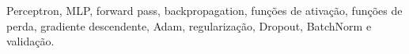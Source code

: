 
Perceptron, MLP, forward pass, backpropagation, funções de ativação, funções de perda, gradiente descendente, Adam, regularização, Dropout, BatchNorm e validação.

